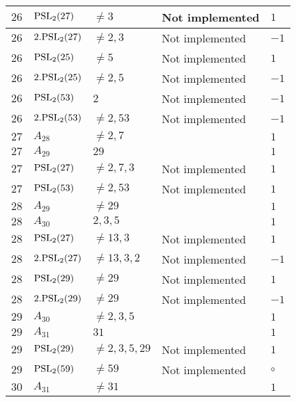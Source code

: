 \documentclass[a4paper, 11pt]{article}
\begin{document}
\begin{longtable}{lllll}
        $ 26 $ & $ {\rm PSL}_{2}(27) $ & $ \neq 3 $ & Not implemented & $ 1  $ \\ \hline
        $ 26 $ & $ 2.{\rm PSL}_{2}(27) $ & $ \neq 2, 3 $ & Not implemented & $ -1  $ \\ \hline
        $ 26 $ & $ {\rm PSL}_{2}(25) $ & $ \neq 5 $ & Not implemented & $ 1  $ \\ \hline
        $ 26 $ & $ 2.{\rm PSL}_{2}(25) $ & $ \neq 2, 5 $ & Not implemented & $ -1  $ \\ \hline
        $ 26 $ & $ {\rm PSL}_{2}(53) $ & $ 2 $ & Not implemented & $ -1  $ \\ \hline
        $ 26 $ & $ 2.{\rm PSL}_{2}(53) $ & $ \neq 2, 53 $ & Not implemented & $ -1  $ \\ \hline
        $ 27 $ & $ A_{28} $ & $ \neq 2, 7 $ & $ ~ $ & $ 1  $ \\ \hline
        $ 27 $ & $ A_{29} $ & $ 29 $ & $ ~ $ & $ 1  $ \\ \hline
        $ 27 $ & $ {\rm PSL}_{2}(27) $ & $ \neq 2, 7, 3 $ & Not implemented & $ 1  $ \\ \hline
        $ 27 $ & $ {\rm PSL}_{2}(53) $ & $ \neq 2, 53 $ & Not implemented & $ 1  $ \\ \hline
        $ 28 $ & $ A_{29} $ & $ \neq 29 $ & $ ~ $ & $ 1  $ \\ \hline
        $ 28 $ & $ A_{30} $ & $ 2, 3, 5 $ & $ ~ $ & $ 1  $ \\ \hline
        $ 28 $ & $ {\rm PSL}_{2}(27) $ & $ \neq 13, 3 $ & Not implemented & $ 1  $ \\ \hline
        $ 28 $ & $ 2.{\rm PSL}_{2}(27) $ & $ \neq 13, 3, 2 $ & Not implemented & $ -1  $ \\ \hline
        $ 28 $ & $ {\rm PSL}_{2}(29) $ & $ \neq 29 $ & Not implemented & $ 1  $ \\ \hline
        $ 28 $ & $ 2.{\rm PSL}_{2}(29) $ & $ \neq 29 $ & Not implemented & $ -1  $ \\ \hline
        $ 29 $ & $ A_{30} $ & $ \neq 2, 3, 5 $ & $ ~ $ & $ 1  $ \\ \hline
        $ 29 $ & $ A_{31} $ & $ 31 $ & $ ~ $ & $ 1  $ \\ \hline
        $ 29 $ & $ {\rm PSL}_{2}(29) $ & $ \neq 2, 3, 5, 29 $ & Not implemented & $ 1  $ \\ \hline
        $ 29 $ & $ {\rm PSL}_{2}(59) $ & $ \neq 59 $ & Not implemented & $\circ$ \\ \hline
        $ 30 $ & $ A_{31} $ & $ \neq 31 $ & $ ~ $ & $ 1  $ \\ \hline

\end{longtable}
\end{document}

